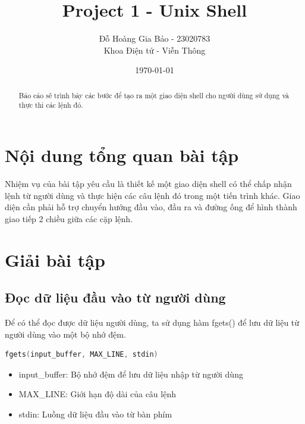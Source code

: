 \documentclass[12pt, letterpaper]{article}
\title{Project 1 - Unix Shell}
\author{Đỗ Hoàng Gia Bảo - 23020783 \\ \small Khoa Điện tử - Viễn Thông}
\date{\today}
\begin{document}
\maketitle

\begin{abstract}
Báo cáo sẽ trình bày các bước để tạo ra một giao diện shell cho người dùng sử dụng và thực thi các lệnh đó.
\end{abstract}
\newpage
\tableofcontents

\newpage
{}
\setcounter{page}{3} %

\section{Nội dung tổng quan bài tập}
Nhiệm vụ của bài tập yêu cầu là thiết kế một giao diện shell có thể chấp nhận lệnh từ người dùng và thực hiện các câu lệnh đó trong một tiến trình khác. Giao diện cần phải hỗ trợ chuyển hướng đầu vào, đầu ra và đường ống để  hình thành giao tiếp 2 chiều giữa các cặp lệnh.
\section{Giải bài tập}
\subsection{Đọc dữ liệu đầu vào từ người dùng}
Để có thể đọc được dữ liệu người dùng, ta sử dụng hàm fgets() để lưu dữ liệu từ người dùng vào một bộ nhớ đệm.
\begin{lstlisting}[language=C, caption={Tham số hàm fgets()}]
    fgets(input_buffer, MAX_LINE, stdin)
\end{lstlisting}
\begin{itemize}
    \item input\_buffer: Bộ nhớ đệm để lưu dữ liệu nhập từ người dùng 
    \item MAX\_LINE: Giới hạn độ dài của câu lệnh
    \item stdin: Luồng dữ liệu đầu vào từ bàn phím
\end{itemize}
\end{document}
